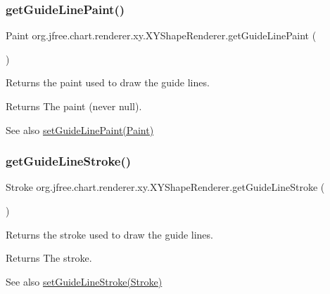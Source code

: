 \subsubsection{\texorpdfstring{get\+Guide\+Line\+Paint()}{getGuideLinePaint()}}
{\footnotesize\ttfamily Paint org.\+jfree.\+chart.\+renderer.\+xy.\+X\+Y\+Shape\+Renderer.\+get\+Guide\+Line\+Paint (\begin{DoxyParamCaption}{ }\end{DoxyParamCaption})}

Returns the paint used to draw the guide lines.

\begin{DoxyReturn}{Returns}
The paint (never {\ttfamily null}).
\end{DoxyReturn}
\begin{DoxySeeAlso}{See also}
\mbox{\hyperlink{classorg_1_1jfree_1_1chart_1_1renderer_1_1xy_1_1_x_y_shape_renderer_a6f45190e4da92e6cf58f841923476157}{set\+Guide\+Line\+Paint(\+Paint)}} 
\end{DoxySeeAlso}
\mbox{\label{classorg_1_1jfree_1_1chart_1_1renderer_1_1xy_1_1_x_y_shape_renderer_af24b2b683eed8f240256c64cc5282c1b}} 
\subsubsection{\texorpdfstring{get\+Guide\+Line\+Stroke()}{getGuideLineStroke()}}
{\footnotesize\ttfamily Stroke org.\+jfree.\+chart.\+renderer.\+xy.\+X\+Y\+Shape\+Renderer.\+get\+Guide\+Line\+Stroke (\begin{DoxyParamCaption}{ }\end{DoxyParamCaption})}

Returns the stroke used to draw the guide lines.

\begin{DoxyReturn}{Returns}
The stroke.
\end{DoxyReturn}
\begin{DoxySeeAlso}{See also}
\mbox{\hyperlink{classorg_1_1jfree_1_1chart_1_1renderer_1_1xy_1_1_x_y_shape_renderer_a6a2c1eabb72522fc743402238dc29453}{set\+Guide\+Line\+Stroke(\+Stroke)}} 
\end{DoxySeeAlso}
\mbox{\label{classorg_1_1jfree_1_1chart_1_1renderer_1_1xy_1_1_x_y_shape_renderer_aba73d86bea4affab0067ca62cc9a68d4}} 
